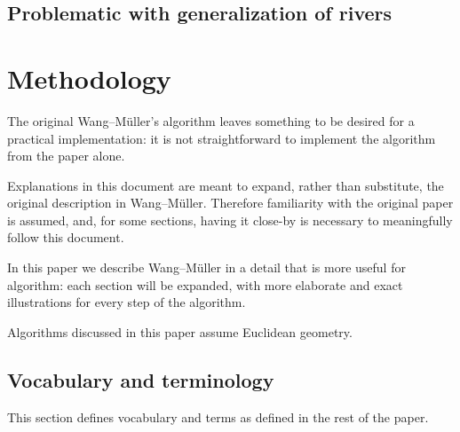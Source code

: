 \documentclass[a4paper]{article}
\newcommand{\WM}{Wang--M{\"u}ller}
\begin{document}
\subsection{Problematic with generalization of rivers}

\section{Methodology}
\label{sec:methodology}

The original {\WM}'s algorithm \cite{wang1998line} leaves something to be
desired for a practical implementation: it is not straightforward to implement
the algorithm from the paper alone.

Explanations in this document are meant to expand, rather than substitute, the
original description in {\WM}. Therefore familiarity with the original paper is
assumed, and, for some sections, having it close-by is necessary to
meaningfully follow this document.

In this paper we describe {\WM} in a detail that is more useful for algorithm:
each section will be expanded, with more elaborate and exact illustrations for
every step of the algorithm.

Algorithms discussed in this paper assume Euclidean geometry.

\subsection{Vocabulary and terminology}

This section defines vocabulary and terms as defined in the rest of the paper.
\end{document}

